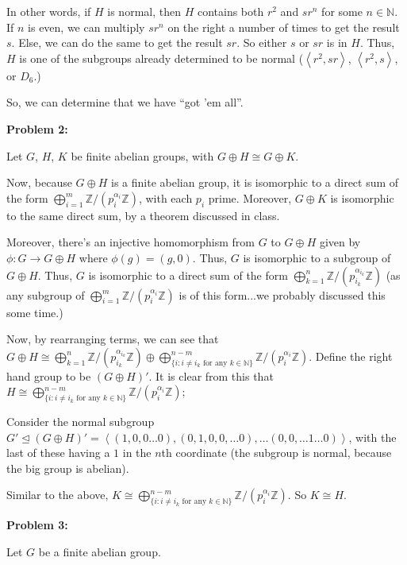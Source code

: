 \documentclass[a4paper,12pt]{article}
\newcommand{\tab}{\hspace{4mm}} %
\newcommand{\shunt}{\vspace{20mm}}
\newcommand{\anbrack}[1]{\left\langle #1 \right\rangle}
\newcommand{\al}{\alpha} %
\newcommand{\N}{\mathbb{N}}
\newcommand{\Z}{\mathbb{Z}}
\newcommand{\subgp}{\mathrel{\unlhd}}
\begin{document}
In other words, if $H$ is normal, then $H$ contains both $r^2$ and $sr^n$ for some $n \in \N$. If $n$ is even, we can multiply $sr^n$ on the right a number of times to get the result $s$. Else, we can do the same to get the result $sr$. So either $s$ or $sr$ is in $H$. Thus, $H$ is one of the subgroups already determined to be normal ($\anbrack{r^2,sr}$, $\anbrack{r^2,s}$, or $D_6$.)

So, we can determine that we have ``got 'em all''.

\shunt

{\bf Problem 2:} %

Let $G$, $H$, $K$ be finite abelian groups, with $G \oplus H \cong G \oplus K$.

Now, because $G \oplus H$ is a finite abelian group, it is isomorphic to a direct sum of the form $\bigoplus\limits_{i=1}^m \Z/(p_i^{\al_i}\Z)$, with each $p_i$ prime. Moreover, $G \oplus K$ is isomorphic to the same direct sum, by a theorem discussed in class.

Moreover, there's an injective homomorphism from $G$ to $G \oplus H$ given by $\phi: G \to G \oplus H$ where $\phi(g) = (g,0)$. Thus, $G$ is isomorphic to a subgroup of $G \oplus H$. Thus, $G$ is isomorphic to a direct sum of the form $\bigoplus\limits_{k=1}^n \Z/(p_{i_k}^{\al_{i_k}}\Z)$ (as any subgroup of $\bigoplus\limits_{i=1}^m \Z/(p_i^{\al_i}\Z)$ is of this form...we probably discussed this some time.)

Now, by rearranging terms, we can see that $G \oplus H \cong \bigoplus\limits_{k=1}^n \Z/(p_{i_k}^{\al_{i_k}}\Z) \oplus \bigoplus\limits_{\{i: i \neq i_k \text{ for any } k \in \N\}}^{n-m} \Z/(p_i^{\al_i}\Z)$. Define the right hand group to be $(G \oplus H)'$. It is clear from this that $H \cong \bigoplus\limits_{\{i: i \neq i_k \text{ for any } k \in \N\}}^{n-m} \Z/(p_i^{\al_i}\Z)$;

\tab Consider the normal subgroup $G' \subgp (G \oplus H)' = \anbrack{(1,0,0 \ldots 0), (0,1,0,0, \ldots 0), \ldots (0,0, \ldots 1 \ldots 0)}$, with the last of these having a $1$ in the $n$th coordinate (the subgroup is normal, because the big group is abelian). 

Similar to the above, $K \cong \bigoplus\limits_{\{i: i \neq i_k \text{ for any } k \in \N\}}^{n-m} \Z/(p_i^{\al_i}\Z)$. So $K \cong H$. 

\shunt

{\bf Problem 3:}

Let $G$ be a finite abelian group.
\end{document}
